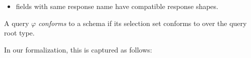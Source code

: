 \begin{definition}
\begin{itemize}
    \item fields with same response name have compatible response shapes.
\end{itemize}
\end{definition}

\begin{definition}
A \gql query $\varphi$ \textit{conforms} to a schema \schema if its selection set conforms to \schema over the query root type.
\end{definition}


In our formalization, this is captured as follows:


